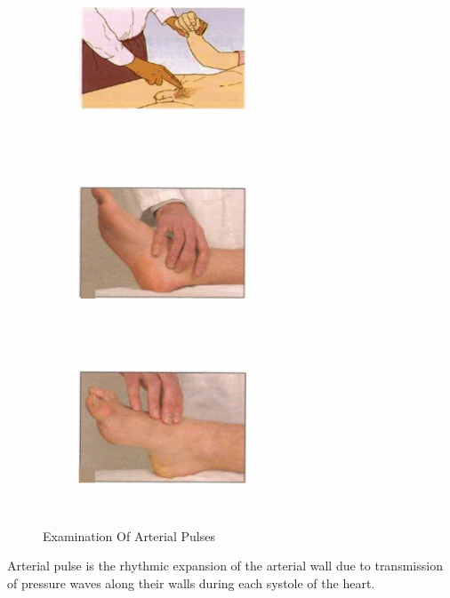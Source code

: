 \documentclass[a4paper,12pt,openany,oneside]{book}
\begin{document}
{\begin{figure}[H]
\begin{subfigure}[t]{.29\textwidth}
			\label{collapsingPulse}
		\end{subfigure}
		\begin{subfigure}[t]{.29\textwidth}
			\includegraphics[height=5cm, width=5cm]{./clinicalPhysioPic/radioFemoralDelay.jpg}
			\label{radioFemoralDelay}
		\end{subfigure}
		\hspace{\fill}
		\begin{subfigure}[t]{.29\textwidth}
			\includegraphics[height=5cm, width=5cm]{./clinicalPhysioPic/posteriorTibial.jpg}
			\label{posteriorTibial}
		\end{subfigure}
		\hspace{\fill}
		\begin{subfigure}[t]{.29\textwidth}
			\includegraphics[height=5cm,width=5cm]{./clinicalPhysioPic/dorsalisPedis.jpg}
			\label{dorsalisPedis}
		\end{subfigure}
		
		\caption*{Examination Of Arterial Pulses}
		\label{arterialPulses}
	\end{figure}
	}
Arterial pulse is the rhythmic expansion of the arterial wall due to transmission of pressure waves along their walls during each systole of the heart.
\end{document}
